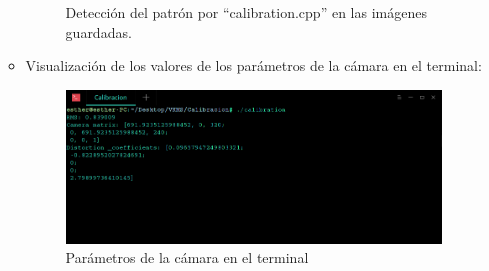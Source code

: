 \begin{itemize}
\begin{itemize}
\begin{figure}[htbp]
\caption{Detección del patrón por ``calibration.cpp'' en las imágenes guardadas.} 
\end{figure}


    \item Visualización de los valores de los parámetros de la cámara en el terminal: \\

    \begin{figure}
    \centering
    \includegraphics[scale = 0.5]{capitulo_04/figuras_dir/parametros.jpg}
    \caption{Parámetros de la cámara en el terminal}
    \end{figure}


\end{itemize}
\end{itemize}
